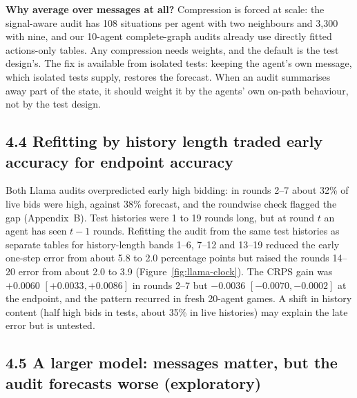 \documentclass[11pt,letterpaper]{article}
\begin{document}
\textbf{Why average over messages at all?}
Compression is forced at scale: the signal-aware audit has 108 situations per agent with two neighbours and 3,300 with nine, and our 10-agent complete-graph audits already use directly fitted actions-only tables.
Any compression needs weights, and the default is the test design's.
The fix is available from isolated tests: keeping the agent's own message, which isolated tests supply, restores the forecast.
When an audit summarises away part of the state, it should weight it by the agents' own on-path behaviour, not by the test design.

\subsection{4.4 Refitting by history length traded early accuracy for endpoint accuracy}

Both Llama audits overpredicted early high bidding: in rounds 2--7 about 32\% of live bids were high, against 38\% forecast, and the roundwise check flagged the gap (Appendix~B).
Test histories were 1 to 19 rounds long, but at round $t$ an agent has seen $t-1$ rounds.
Refitting the audit from the same test histories as separate tables for history-length bands 1--6, 7--12 and 13--19 reduced the early one-step error from about 5.8 to 2.0 percentage points but raised the rounds 14--20 error from about 2.0 to 3.9 (Figure~\ref{fig:llama-clock}).
The CRPS gain was $+0.0060$ $[+0.0033, +0.0086]$ in rounds 2--7 but $-0.0036$ $[-0.0070, -0.0002]$ at the endpoint, and the pattern recurred in fresh 20-agent games.
A shift in history content (half high bids in tests, about 35\% in live histories) may explain the late error but is untested.

\subsection{4.5 A larger model: messages matter, but the audit forecasts worse (exploratory)}
\end{document}
